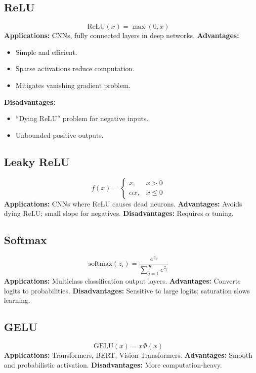 \documentclass[11pt]{article}
\begin{document}
\subsection{ReLU}
\[
\mathrm{ReLU}(x) = \max(0, x)
\]
\textbf{Applications:} CNNs, fully connected layers in deep networks.  
\textbf{Advantages:}
\begin{itemize}
\item Simple and efficient.
\item Sparse activations reduce computation.
\item Mitigates vanishing gradient problem.
\end{itemize}
\textbf{Disadvantages:}
\begin{itemize}
\item ``Dying ReLU'' problem for negative inputs.
\item Unbounded positive outputs.
\end{itemize}

\subsection{Leaky ReLU}
\[
f(x) = \begin{cases} x, & x > 0 \\ \alpha x, & x \le 0 \end{cases}
\]
\textbf{Applications:} CNNs where ReLU causes dead neurons.  
\textbf{Advantages:} Avoids dying ReLU; small slope for negatives.  
\textbf{Disadvantages:} Requires $\alpha$ tuning.

\subsection{Softmax}
\[
\mathrm{softmax}(z_i) = \frac{e^{z_i}}{\sum_{j=1}^K e^{z_j}}
\]
\textbf{Applications:} Multiclass classification output layers.  
\textbf{Advantages:} Converts logits to probabilities.  
\textbf{Disadvantages:} Sensitive to large logits; saturation slows learning.

\subsection{GELU}
\[
\mathrm{GELU}(x) = x \Phi(x)
\]
\textbf{Applications:} Transformers, BERT, Vision Transformers.  
\textbf{Advantages:} Smooth and probabilistic activation.  
\textbf{Disadvantages:} More computation-heavy.
\end{document}
